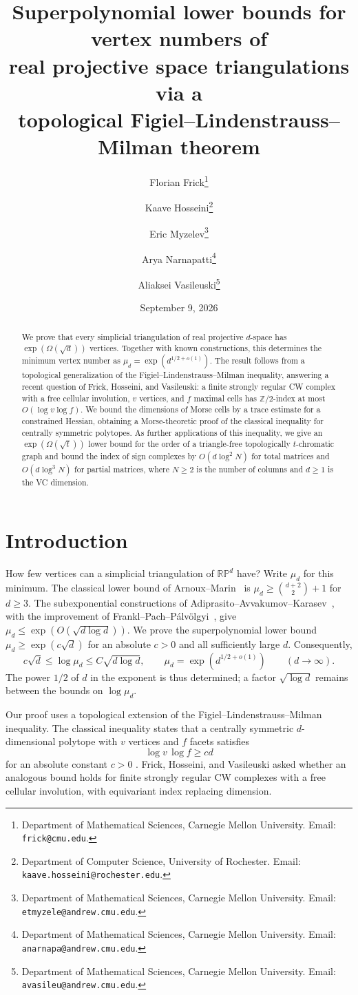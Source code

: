 \documentclass[11pt]{article}
\title{Superpolynomial lower bounds for vertex numbers of\\
real projective space triangulations via a\\
topological Figiel--Lindenstrauss--Milman theorem}
\author{
Florian Frick\thanks{Department of Mathematical Sciences, Carnegie Mellon University. Email: \texttt{frick@cmu.edu}.}
\and
Kaave Hosseini\thanks{Department of Computer Science, University of Rochester. Email: \texttt{kaave.hosseini@rochester.edu}.}
\and
Eric Myzelev\thanks{Department of Mathematical Sciences, Carnegie Mellon University. Email: \texttt{etmyzele@andrew.cmu.edu}.}
\and
Arya Narnapatti\thanks{Department of Mathematical Sciences, Carnegie Mellon University. Email: \texttt{anarnapa@andrew.cmu.edu}.}
\and
Aliaksei Vasileuski\thanks{Department of Mathematical Sciences, Carnegie Mellon University. Email: \texttt{avasileu@andrew.cmu.edu}.}
}
\date{September 9, 2026}
\theoremstyle{remark}
\newcommand{\Z}{\mathbb Z}
\newcommand{\RP}{\mathbb {RP}}
\begin{document}
\maketitle
\vspace{-1.5em}

\begin{abstract}
We prove that every simplicial triangulation of real projective
$d$-space has $\exp(\Omega(\sqrt d))$ vertices. Together with known
constructions, this determines the minimum vertex number as
$\mu_d=\exp(d^{1/2+o(1)})$. The result follows from a topological generalization of the
Figiel--Lindenstrauss--Milman inequality, answering a recent question of Frick,
Hosseini, and Vasileuski: a finite strongly regular CW
complex with a free cellular involution, $v$ vertices, and $f$ maximal
cells has $\Z/2$-index at most $O(\log v\log f)$. We bound the dimensions
of Morse cells by a trace estimate for a constrained Hessian, obtaining
a Morse-theoretic proof of the classical inequality for centrally
symmetric polytopes. As further applications of this
inequality, we give an $\exp(\Omega(\sqrt t))$ lower bound for the order
of a triangle-free topologically $t$-chromatic graph and bound the index of sign complexes by $O(d\log^2 N)$ for total
matrices and $O(d\log^3 N)$ for partial matrices, where $N\geq2$
is the number of columns and $d\geq1$ is the VC dimension.
\end{abstract}

\section{Introduction}

How few vertices can a simplicial triangulation of $\RP^d$ have?
Write $\mu_d$ for this minimum. The classical lower bound of
Arnoux--Marin~\cite{AM} is $\mu_d\geq\binom{d+2}{2}+1$ for $d\geq3$.
The subexponential constructions of
Adiprasito--Avvakumov--Karasev~\cite{AAK}, with the improvement of
Frankl--Pach--P\'alv\"olgyi~\cite[equation~(3)]{FPP}, give
$\mu_d\leq\exp(O(\sqrt{d\log d}))$.
We prove the superpolynomial lower bound
$\mu_d\geq\exp(c\sqrt d)$ for an absolute $c>0$ and all sufficiently
large $d$. Consequently,
\[
 c\sqrt d\leq\log\mu_d\leq C\sqrt{d\log d},
 \qquad \mu_d=\exp(d^{1/2+o(1)})
 \qquad(d\longrightarrow\infty).
\]
The power $1/2$ of $d$ in the exponent is thus determined; a factor
$\sqrt{\log d}$ remains between the bounds on $\log\mu_d$.

Our proof uses a topological extension of the
Figiel--Lindenstrauss--Milman inequality. The classical inequality
states that a centrally symmetric $d$-dimensional polytope with
$v$ vertices and $f$ facets satisfies
\begin{equation}\label{eq:flm}
 \log v\,\log f\geq c d
\end{equation}
for an absolute constant $c>0$ \cite{FLM}.
Frick, Hosseini, and Vasileuski \cite[Question~37]{FHV} asked
whether an analogous bound holds for finite strongly regular
CW complexes with a free cellular involution, with equivariant
index replacing dimension.
\end{document}
